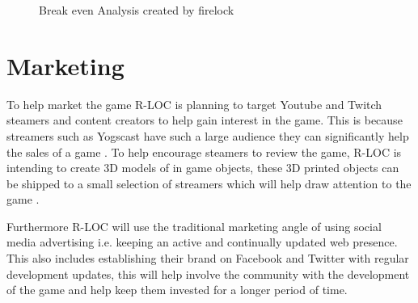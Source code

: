 \documentclass{scrartcl}
\begin{document}
\begin{landscape}
	\begin{figure}[h]
		\caption{Break even Analysis created by firelock}
	\end{figure}
\end{landscape}



\section{Marketing} %
To help market the game R-LOC is planning to target Youtube and Twitch steamers and content creators to help gain interest in the game.
This is because streamers such as Yogscast have such a large audience they can significantly help the sales of a game \cite{Hoggins, Rose}.  To help encourage steamers to review the game, R-LOC is intending to create 3D models of in game objects, these 3D printed objects can be shipped to a small selection of streamers which will help draw attention to the game \cite{Rose}.

Furthermore R-LOC will use the traditional marketing angle of using social media advertising i.e. keeping an active and continually updated web presence. 
This also includes establishing their brand on Facebook and Twitter with regular development updates, this will help involve the community with the development of the game and help keep them invested for a longer period of time.
\end{document}
